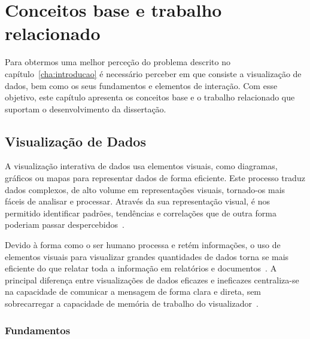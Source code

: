 
%

\chapter{Conceitos base e trabalho relacionado}
\label{cha:conceitos_base}

Para obtermos uma melhor perceção do problema descrito no capítulo~\ref{cha:introducao} é necessário perceber em que consiste a visualização de dados, bem como os seus fundamentos e elementos de interação. Com esse objetivo, este capítulo apresenta os conceitos base e o trabalho relacionado que suportam o desenvolvimento da dissertação.

\section{Visualização de Dados}
\label{sec:vis_dados}

A visualização interativa de dados usa elementos visuais, como diagramas, gráficos ou mapas para representar dados de forma eficiente. Este processo traduz dados complexos, de alto volume em representações visuais, tornado-os mais fáceis de analisar e processar. Através da sua representação visual, é nos permitido identificar padrões, tendências e correlações que de outra forma poderiam passar despercebidos~\cite{keim2002information}.

Devido à forma como o ser humano processa e retém informações, o uso de elementos visuais para visualizar grandes quantidades de dados torna se mais eficiente do que relatar toda a informação em relatórios e documentos~\cite{ware2019information}. A principal diferença entre visualizações de dados eficazes e ineficazes centraliza-se na capacidade de comunicar a mensagem de forma clara e direta, sem sobrecarregar a capacidade de memória de trabalho do visualizador~\cite{evergreen2013design}.

\subsection{Fundamentos} %
\label{sub:fundamentos}

